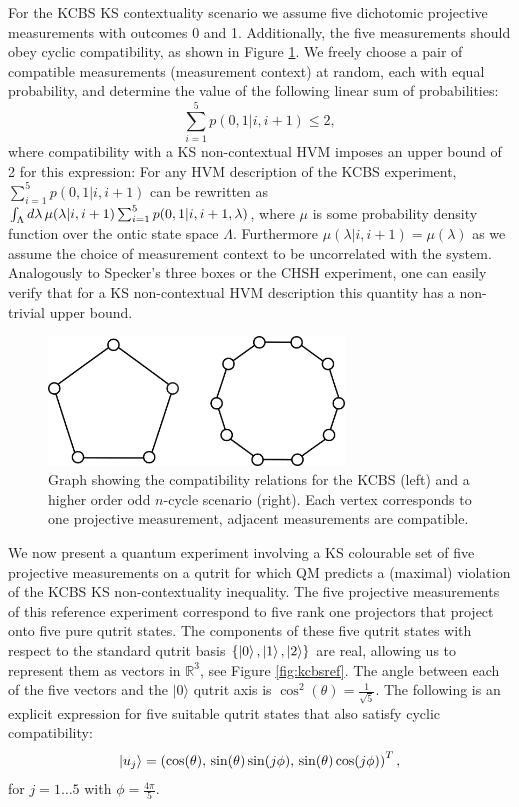 For the KCBS KS contextuality scenario we assume five dichotomic projective measurements with outcomes 0 and 1. Additionally, the five measurements should obey cyclic compatibility, as shown in Figure \ref{fig:kcbscompat}. We freely choose a pair of compatible measurements (measurement context) at random, each with equal probability, and determine the value of the following linear sum of probabilities:
\begin{equation*}
    \sum_{i=1}^5 p(0,1\vert i, i+1)\leq 2,
\end{equation*}
where compatibility with a KS non-contextual HVM imposes an upper bound of 2 for this expression: For any HVM description of the KCBS experiment, $\sum_{i=1}^5 p(0,1\vert i,i+1)$ can be rewritten as $\int_{\Lambda}d\lambda\thinspace\mu(\lambda\vert i,i+1)\sum_{i=1}^5 p(0,1\vert i, i+1, \lambda)$, where $\mu$ is some probability density function over the ontic state space $\Lambda$. Furthermore $\mu(\lambda\vert i,i+1)=\mu(\lambda)$ as we assume the choice of measurement context to be uncorrelated with the system. Analogously to Specker's three boxes or the CHSH experiment, one can easily verify that for a KS non-contextual HVM description this quantity has a non-trivial upper bound. 

\begin{figure}
    \centering
    \includegraphics[width=0.7\textwidth]{images/kcbscompat.png}
    \caption{Graph showing the compatibility relations for the KCBS (left) and a higher order odd $n$-cycle scenario (right). Each vertex corresponds to one projective measurement, adjacent measurements are compatible.}
    \label{fig:kcbscompat}
\end{figure}

We now present a quantum experiment involving a KS colourable set of five projective measurements on a qutrit for which QM predicts a (maximal) violation of the KCBS KS non-contextuality inequality. The five projective measurements of this reference experiment correspond to five rank one projectors that project onto five pure qutrit states. The components of these five qutrit states with respect to the standard qutrit basis $\{\ket{0}, \ket{1}, \ket{2}\}$ are real, allowing us to represent them as vectors in $\mathbb{R}^3$, see Figure \ref{fig:kcbsref}. The angle between each of the five vectors and the $\vert 0\rangle$ qutrit axis is $\cos^2(\theta)=\frac{1}{\sqrt{5}}$. The following is an explicit expression for five suitable qutrit states that also satisfy cyclic compatibility:
\begin{align*}
    \ket{u_j} = \left(\cos(\theta),\thinspace\sin(\theta)\sin(j\phi),\thinspace\sin(\theta)\cos(j\phi)\right)^T,
\end{align*}
for $\displaystyle j=1\dots 5$ with $\displaystyle\phi=\frac{4\pi}{5}$.

